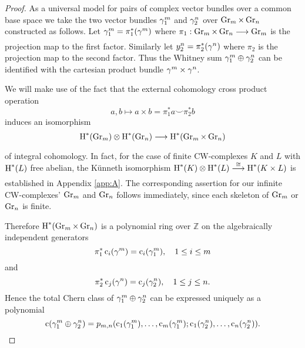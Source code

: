 \documentclass[../main]{subfiles}
\begin{document}
\begin{proof} As a universal model for pairs of complex vector bundles over a common base space we take the two vector bundles $\gamma_{1}^{m}$ and $\gamma_{2}^{n}$ over $\operatorname{Gr}_{m} \times \operatorname{Gr}_{n}$ constructed as follows. Let $\gamma_{1}^{m}=\pi_{1}^{*}(\gamma^{m})$ where $\pi_{1}: \grassmannian_{m} \times \grassmannian_{n} \varrightarrow{} \grassmannian_{m}$ is the projection map to the first factor. Similarly let $y_{2}^{n}=\pi_{2}^{*}(\gamma^{n})$ where $\pi_{2}$ is the projection map to the second factor. Thus the Whitney sum $\gamma_{1}^{m} \oplus \gamma_{2}^{n}$ can be identified with the cartesian product bundle $\gamma^{m} \times \gamma^{n}$.

We will make use of the fact that the external cohomology cross product operation
\[
a, b \mapsto a \times b=\pi_{1}^{*} a \smile \pi_{2}^{*} b
\]
induces an isomorphism
\[
\homology^{*}(\grassmannian_{m}) \otimes \homology^{*}(\grassmannian_{n}) \varrightarrow{} \homology^{*}(\grassmannian_{m} \times \grassmannian_{n})
\]
of integral cohomology. In fact, for the case of finite CW-complexes $K$ and $L$ with $\operatorname{H}^{*}(L)$ free abelian, the Künneth isomorphism $\homology^{*}(K) \otimes \homology^{*}(L)\varrightarrow{\cong} \homology^{*}(K \times L)$ is established in Appendix \ref{app:A}. The corresponding assertion for our infinite CW-complexes' $\operatorname{Gr}_{m}$ and $\operatorname{Gr}_{n}$ follows immediately, since each skeleton of $\operatorname{Gr}_{m}$ or $\operatorname{Gr}_{n}$ is finite.

Therefore $\operatorname{H}^{*}(\operatorname{Gr}_{m} \times \operatorname{Gr}_{n})$ is a polynomial ring over $\mathbb{Z}$ on the algebraically independent generators
\[
\pi_{1}^{*} \operatorname{c}_{i}(\gamma^{m})=\operatorname{c}_{i}(\gamma_{1}^{m}), \quad 1 \leq i \leq m
\]
and
\[
\pi_{2}^{*} \operatorname{c}_{j}(\gamma^{n})=\operatorname{c}_{j}(\gamma_{2}^{n}), \quad 1 \leq j \leq n .
\]
Hence the total Chern class of $\gamma_{1}^{m} \oplus \gamma_{2}^{n}$ can be expressed uniquely as a polynomial
\[
\operatorname{c}(\gamma_{1}^{m} \oplus \gamma_{2}^{n})=p_{m, n}(\operatorname{c}_{1}(\gamma_{1}^{m}), \ldots, \operatorname{c}_{m}(\gamma_{1}^{m}) ; \operatorname{c}_{1}(\gamma_{2}^{n}), \ldots, \operatorname{c}_{n}(\gamma_{2}^{n})) .
\]


\end{proof}
\end{document}
